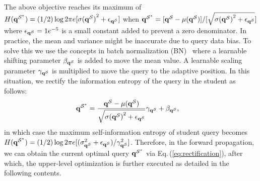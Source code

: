 \documentclass[10pt,twocolumn,letterpaper]{article}
\begin{document}
%
The above objective reaches its maximum of $H({\bf q}^{\mathcal{S}^*}) = (1/2) \log 2 \pi e [\sigma({{\bf q}^{\mathcal{S}})}^2 + \epsilon_{{\bf q}^{\mathcal{S}}}]$ when ${\bf q}^{\mathcal{S}^*} = [{\bf q}^{\mathcal{S}} - \mu({\bf q}^{\mathcal{S}})] / [{\sqrt{\sigma{({\bf q}^{\mathcal{S}})}^2 + \epsilon_{{\bf q}^{\mathcal{S}}}}}]$ where $\epsilon_{{\bf q}^{\mathcal{S}}} = 1e^{-5}$ is a small constant added to prevent a zero denominator.
%
%
%
In practice, the mean and variance might be inaccurate due to query data bias. To solve this we use the concepts in batch normalization (BN)~\cite{santurkar2018does,ioffe2015batch} where a learnable shifting parameter $\beta_{{{\bf q}}^{\mathcal{S}}}$ is added to move the mean value. A learnable scaling parameter $\gamma_{{\bf q}^{\mathcal{S}}}$ is multiplied to move the query to the adaptive position. In this situation, we rectify the information entropy of the query in the student as follows:
%
    \begin{equation}
        \begin{aligned}
        {\bf q}^{\mathcal{S}^*} &= \frac{{\bf q}^{\mathcal{S}} - \mu({\bf q}^{\mathcal{S}})} {{ \sqrt{\sigma{({\bf q}^{\mathcal{S}})}^2 + \epsilon_{{\bf q}^{\mathcal{S}}}}}}\gamma_{{\bf q}^{\mathcal{S}}} + \beta_{{\bf q}^{\mathcal{S}}},
        \end{aligned}
    \label{eq:rectification}
    \end{equation}
    in which case the maximum self-information entropy of student query becomes $H({\bf q}^{\mathcal{S}^*}) = (1/2)\log 2 \pi e [(\sigma^2_{{\bf q}^{\mathcal{S}}} + \epsilon_{{\bf q}^{\mathcal{S}}})/\gamma^2_{{\bf q}^{\mathcal{S}}}]$. 
    Therefore, in the forward propagation, we can obtain the current optimal query ${\bf q}^{\mathcal{S}^*}$ via Eq.\,(\ref{eq:rectification}), after which, the upper-level optimization is further executed as detailed in the following contents.
    
    
\end{document}
